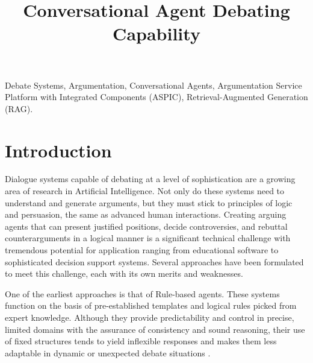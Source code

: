 \documentclass[conference]{IEEEtran}
\begin{document}
\title{Conversational Agent Debating Capability}

\author{
\and
{}
}

\maketitle

\begin{abstract}

\end{abstract}

\begin{IEEEkeywords}
Debate Systems, Argumentation, Conversational Agents, Argumentation Service Platform with Integrated Components (ASPIC), Retrieval-Augmented Generation (RAG).
\end{IEEEkeywords}

\section{Introduction}
Dialogue systems capable of debating at a level of sophistication are a growing area of research in Artificial Intelligence. Not only do these systems need to understand and generate arguments, but they must stick to principles of logic and persuasion, the same as advanced human interactions. Creating arguing agents that can present justified positions, decide controversies, and rebuttal counterarguments in a logical manner is a significant technical challenge with tremendous potential for application ranging from educational software to sophisticated decision support systems. Several approaches have been formulated to meet this challenge, each with its own merits and weaknesses.

One of the earliest approaches is that of Rule-based agents. These systems function on the basis of pre-established templates and logical rules picked from expert knowledge. Although they provide predictability and control in precise, limited domains with the assurance of consistency and sound reasoning, their use of fixed structures tends to yield inflexible responses and makes them less adaptable in dynamic or unexpected debate situations \cite{montealto2021rulebased}.
\end{document}
